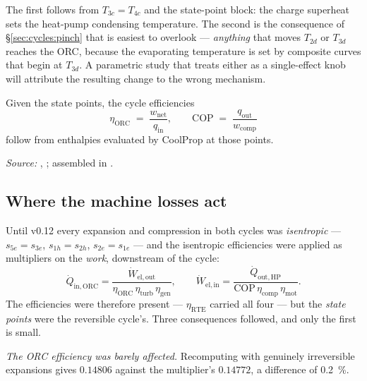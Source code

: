 \noindent
The first follows from $T_{3c}=T_{4c}$ and the state-point block: the charge
superheat sets the heat-pump condensing temperature. The second is the
consequence of \S\ref{sec:cycles:pinch} that is easiest to overlook ---
\emph{anything} that moves $T_{2d}$ or $T_{3d}$ reaches the ORC, because the
evaporating temperature is set by composite curves that begin at $T_{3d}$. A
parametric study that treats either as a single-effect knob will attribute the
resulting change to the wrong mechanism.

Given the state points, the cycle efficiencies
\begin{equation}
  \eta_{\mathrm{ORC}} \;=\; \frac{w_{\mathrm{net}}}{q_{\mathrm{in}}},
  \qquad
  \mathrm{COP} \;=\; \frac{q_{\mathrm{out}}}{w_{\mathrm{comp}}}
  \label{eq:cycle-eff}
\end{equation}
follow from enthalpies evaluated by CoolProp at those points.

\emph{Source:} ,
; assembled in .

\subsection{Where the machine losses act}
\label{sec:cycles:machines}

Until v0.12 every expansion and compression in both cycles was \emph{isentropic}
--- $s_{5e}=s_{3e}$, $s_{1h}=s_{2h}$, $s_{2e}=s_{1e}$ --- and the isentropic
efficiencies were applied as multipliers on the \emph{work}, downstream of the
cycle:
\begin{equation}
  \dot Q_{\mathrm{in,ORC}}
  = \frac{\dot W_{\mathrm{el,out}}}
         {\eta_{\mathrm{ORC}}\,\eta_{\mathrm{turb}}\,\eta_{\mathrm{gen}}},
  \qquad
  \dot W_{\mathrm{el,in}}
  = \frac{\dot Q_{\mathrm{out,HP}}}
         {\mathrm{COP}\,\eta_{\mathrm{comp}}\,\eta_{\mathrm{mot}}} .
  \label{eq:old-multipliers}
\end{equation}
The efficiencies were therefore present --- $\eta_{\mathrm{RTE}}$ carried all
four --- but the \emph{state points} were the reversible cycle's. Three
consequences followed, and only the first is small.

\emph{The ORC efficiency was barely affected.} Recomputing with genuinely
irreversible expansions gives $0.14806$ against the multiplier's $0.14772$, a
difference of \SI{0.2}{\percent}.

